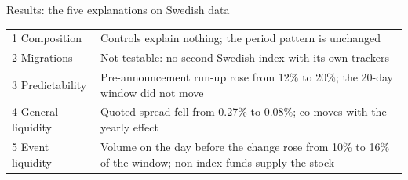 \documentclass[aspectratio=169]{beamer}
\begin{document}
\begin{frame}{Results: the five explanations on Swedish data}
  \footnotesize
  \begin{tabular}{p{2.6cm}p{10.4cm}}
    \toprule
    1 Composition & Controls explain nothing; the period pattern is unchanged \\
    2 Migrations & Not testable: no second Swedish index with its own trackers \\
    3 Predictability & Pre-announcement run-up rose from 12\% to 20\%; the 20-day window did not move \\
    4 General liquidity & Quoted spread fell from 0.27\% to 0.08\%; co-moves with the yearly effect \\
    5 Event liquidity & Volume on the day before the change rose from 10\% to 16\% of the window; non-index funds supply the stock \\
    \bottomrule
  \end{tabular}
\end{frame}
\end{document}
